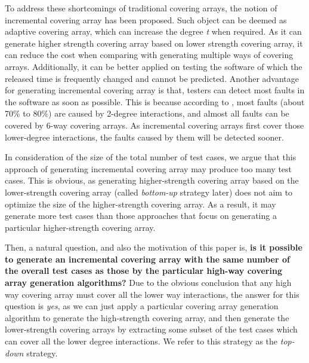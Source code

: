 \documentclass[conference]{IEEEtran}
\theoremstyle{definition}
\begin{document}

To address these shortcomings of traditional covering arrays, the notion of incremental covering array \cite{fouche2009incremental} has been proposed. Such object can be deemed as adaptive covering array, which can increase the degree \emph{t} when required. As it can generate higher strength covering array based on lower strength covering array, it can reduce the cost when comparing with generating multiple ways of covering arrays. Additionally, it can be better applied on testing the software of which the released time is  frequently changed and cannot be predicted. Another advantage for generating incremental covering array is that, testers can detect most faults in the software as soon as possible. This is because according to \cite{kuhn2002investigation}, most faults (about 70\% to 80\%) are caused by 2-degree interactions, and almost all faults can be covered by 6-way covering arrays. As incremental covering arrays first cover those lower-degree interactions, the faults caused by them will be detected sooner.


In consideration of the size of the total number of test cases, we argue that this approach of generating incremental covering array may produce too many test cases. This is obvious, as generating higher-strength covering array based on the lower-strength covering array (called \emph{bottom-up} strategy later) does not aim to optimize the size of the higher-strength covering array. As a result, it may generate more test cases than those approaches that focus on generating a particular higher-strength covering array.

Then, a natural question, and also the motivation of this paper is, \textbf{is it possible to generate an incremental covering array with the same number of the overall test cases as those by the particular high-way covering array generation algorithms?}  Due to the obvious conclusion that any high way covering array must cover all the lower way interactions, the answer for this question is \emph{yes}, as we can just apply a particular covering array generation algorithm to generate the high-strength covering array, and then generate the lower-strength covering arrays by extracting some subset of the test cases which can cover all the lower degree interactions. We refer to this strategy as the \emph{top-down} strategy.
\end{document}
